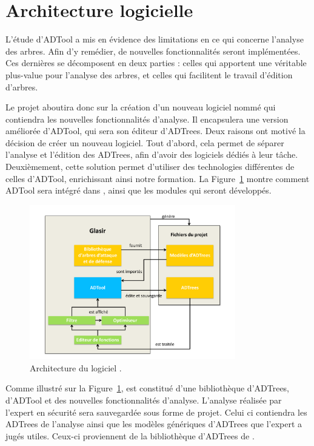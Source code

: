 \section{Architecture logicielle}
    \label{section:archi}

    L'étude d'ADTool a mis en évidence des limitations en ce qui concerne l'analyse des arbres. Afin d'y remédier, de nouvelles fonctionnalités seront implémentées. Ces dernières se décomposent en deux parties : celles qui apportent une véritable plus-value pour l'analyse des arbres, et celles qui facilitent le travail d'édition d'arbres. 

    Le projet aboutira donc sur la création d'un nouveau logiciel nommé \glasir{} qui contiendra les nouvelles fonctionnalités d'analyse. Il encapsulera une version améliorée d'ADTool, qui sera son éditeur d'ADTrees. Deux raisons ont motivé la décision de créer un nouveau logiciel. Tout d'abord, cela permet de séparer l'analyse et l'édition des ADTrees, afin d'avoir des logiciels dédiés à leur tâche. Deuxièmement, cette solution permet d'utiliser des technologies différentes de celles d'ADTool, enrichissant ainsi notre formation. La {\sc Figure}~\ref{fig:architecture_Glasir} montre comment ADTool sera intégré dans \glasir{}, ainsi que les modules qui seront développés. %

        \begin{figure}[h!]
            \centering
                \includegraphics[width=0.8\textwidth]{figure/archiGlasir.pdf}
            \caption{Architecture du logiciel \glasir{}.}
            \label{fig:architecture_Glasir}
        \end{figure}

    Comme illustré sur la {\sc Figure}~\ref{fig:architecture_Glasir}, \glasir{} est constitué d'une bibliothèque d'ADTrees, d'ADTool et des nouvelles fonctionnalités d'analyse.
    L'analyse réalisée par l'expert en sécurité sera sauvegardée sous forme de projet.
    Celui ci contiendra les ADTrees de l'analyse ainsi que les modèles génériques d'ADTrees que l'expert a jugés utiles. Ceux-ci proviennent de la bibliothèque d'ADTrees de \glasir{}.
        
